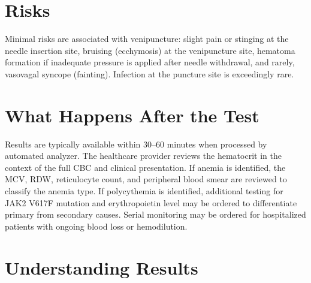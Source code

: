 \section*{Risks}
Minimal risks are associated with venipuncture: slight pain or stinging at the needle insertion site, bruising (ecchymosis) at the venipuncture site, hematoma formation if inadequate pressure is applied after needle withdrawal, and rarely, vasovagal syncope (fainting). Infection at the puncture site is exceedingly rare.

\section*{What Happens After the Test}
Results are typically available within 30--60 minutes when processed by automated analyzer. The healthcare provider reviews the hematocrit in the context of the full CBC and clinical presentation. If anemia is identified, the MCV, RDW, reticulocyte count, and peripheral blood smear are reviewed to classify the anemia type. If polycythemia is identified, additional testing for JAK2 V617F mutation and erythropoietin level may be ordered to differentiate primary from secondary causes. Serial monitoring may be ordered for hospitalized patients with ongoing blood loss or hemodilution.

\section*{Understanding Results}

